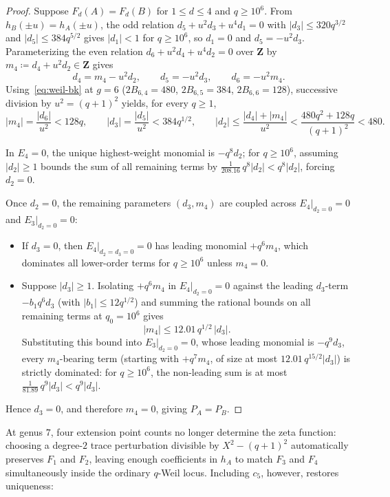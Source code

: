\documentclass[11pt]{amsart}
\theoremstyle{remark}
\newcommand{\Z}{\mathbf{Z}}
\begin{document}
\begin{proof}
Suppose $F_d(A) = F_d(B)$ for $1 \le d \le 4$ and $q \ge 10^6$. From $h_B(\pm u) = h_A(\pm u)$, the odd relation $d_5 + u^2 d_3 + u^4 d_1 = 0$ with $|d_3| \le 320 q^{3/2}$ and $|d_5| \le 384 q^{5/2}$ gives $|d_1| < 1$ for $q \ge 10^6$, so $d_1 = 0$ and $d_5 = -u^2 d_3$. Parameterizing the even relation $d_6 + u^2 d_4 + u^4 d_2 = 0$ over $\Z$ by $m_4 \coloneqq d_4 + u^2 d_2 \in \Z$ gives
\[
d_4 = m_4 - u^2 d_2, \qquad d_5 = -u^2 d_3, \qquad d_6 = -u^2 m_4.
\]
Using~\eqref{eq:weil-bk} at $g = 6$ ($2 B_{6,4} = 480$, $2 B_{6,5} = 384$, $2 B_{6,6} = 128$), successive division by $u^2 = (q + 1)^2$ yields, for every $q \ge 1$,
\[
|m_4| = \frac{|d_6|}{u^2} < 128 q, \qquad |d_3| = \frac{|d_5|}{u^2} < 384 q^{1/2}, \qquad |d_2| \le \frac{|d_4| + |m_4|}{u^2} < \frac{480 q^2 + 128 q}{(q + 1)^2} < 480.
\]

In $E_4 = 0$, the unique highest-weight monomial is $-q^8 d_2$; for $q \ge 10^6$, assuming $|d_2| \ge 1$ bounds the sum of all remaining terms by $\frac{1}{208.16}\, q^8 |d_2| < q^8 |d_2|$, forcing $d_2 = 0$.

Once $d_2 = 0$, the remaining parameters $(d_3, m_4)$ are coupled across $E_4|_{d_2 = 0} = 0$ and $E_3|_{d_2 = 0} = 0$:
\begin{itemize}
\item If $d_3 = 0$, then $E_4|_{d_2 = d_3 = 0} = 0$ has leading monomial $+q^6 m_4$, which dominates all lower-order terms for $q \ge 10^6$ unless $m_4 = 0$.
\item Suppose $|d_3| \ge 1$. Isolating $+q^6 m_4$ in $E_4|_{d_2 = 0} = 0$ against the leading $d_3$-term $-b_1 q^6 d_3$ (with $|b_1| \le 12 q^{1/2}$) and summing the rational bounds on all remaining terms at $q_0 = 10^6$ gives
\[
|m_4| \le 12.01\, q^{1/2}\, |d_3|.
\]
Substituting this bound into $E_3|_{d_2 = 0} = 0$, whose leading monomial is $-q^9 d_3$, every $m_4$-bearing term (starting with $+q^7 m_4$, of size at most $12.01\, q^{15/2} |d_3|$) is strictly dominated: for $q \ge 10^6$, the non-leading sum is at most $\frac{1}{81.89}\, q^9 |d_3| < q^9 |d_3|$.
\end{itemize}
Hence $d_3 = 0$, and therefore $m_4 = 0$, giving $P_A = P_B$.
\end{proof}

At genus $7$, four extension point counts no longer determine the zeta function: choosing a degree-$2$ trace perturbation divisible by $X^2 - (q + 1)^2$ automatically preserves $F_1$ and $F_2$, leaving enough coefficients in $h_A$ to match $F_3$ and $F_4$ simultaneously inside the ordinary $q$-Weil locus. Including $c_5$, however, restores uniqueness:
\end{document}
